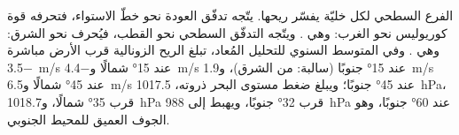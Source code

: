 الفرع السطحي لكل خليّة يفسّر ريحها. يتّجه تدفّق العودة  نحو خطّ الاستواء، فتحرفه قوة كوريوليس نحو الغرب: وهي . ويتّجه التدفّق السطحي  نحو القطب، فيُحرف نحو الشرق: وهي . وفي المتوسط السنوي للتحليل المُعاد، تبلغ الريح الزونالية قرب الأرض مباشرة \qty{-3.5}{m/s} عند \ang{15} شمالًا و\qty{-4.4}{m/s} عند \ang{15} جنوبًا (سالبة: من الشرق)، و\qty{+1.9}{m/s} عند \ang{45} شمالًا و\qty{+6.5}{m/s} عند \ang{45} جنوبًا؛ ويبلغ ضغط مستوى البحر ذروته، \qty{1017.5}{hPa}، قرب \ang{35} شمالًا، و\qty{1018.7}{hPa} قرب \ang{32} جنوبًا، ويهبط إلى \qty{988}{hPa} عند \ang{60} جنوبًا، وهو الجوف العميق للمحيط الجنوبي.

